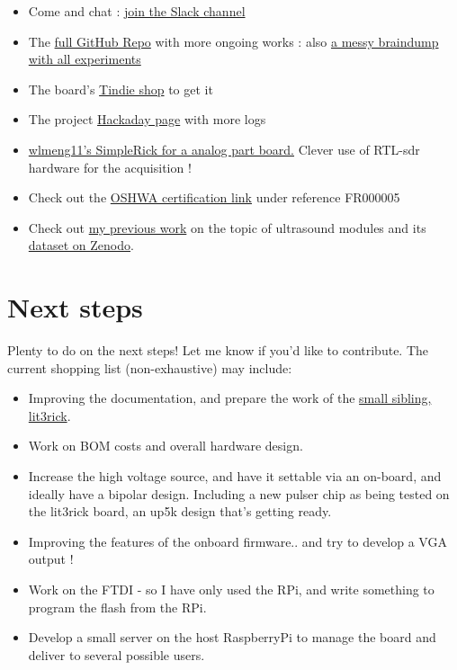 \documentclass{article}
\begin{document}
\begin{itemize}
\item Come and chat : \href{https://join.slack.com/usdevkit/shared_invite/MTkxODU5MjU0NjI1LTE0OTY1ODgxMDEtMmYyZTliZDBlZA}{join the Slack channel} 
\item The \href{https://github.com/kelu124/un0rick}{ full GitHub Repo} with more ongoing works : also \href{https://github.com/kelu124/echomods/}{a messy braindump with all experiments} 
\item The board’s \href{https://www.tindie.com/stores/kelu124/}{Tindie shop} to get it
\item The project \href{https://hackaday.io/project/28375-un0rick-an-ice40-ultrasound-board}{ Hackaday page} with more logs
\item \href{https://github.com/wlmeng11/SimpleRick}{wlmeng11’s SimpleRick for a analog part board.} Clever use of RTL-sdr hardware for the acquisition !
\item Check out the \href{https://certification.oshwa.org/fr000005.html}{OSHWA  certification link} under reference FR000005
\item Check out \href{https://openhardware.metajnl.com/articles/10.5334/joh.2/}{my previous work} on the topic of ultrasound modules \cite{kelu124} and its \href{http://doi.org/10.5281/zenodo.377054}{dataset on Zenodo}.

\end{itemize}

 \section{Next steps}

Plenty to do on the next steps! Let me know if you'd like to contribute. The current shopping list (non-exhaustive) may include:

\begin{itemize}
\item Improving the documentation, and prepare the work of the \href{https://github.com/kelu124/lit3rick}{small sibling, lit3rick}.
\item Work on BOM costs and overall hardware design.
\item Increase the high voltage source, and have it settable via an on-board, and ideally have a bipolar design. Including a new pulser chip as being tested on the lit3rick board, an up5k design that's getting ready.
\item Improving the features of the onboard firmware.. and try to develop a VGA output !
\item Work on the FTDI - so I have only used the RPi, and write something to program the flash from the RPi.
\item Develop a small server on the host RaspberryPi to manage the board and deliver to several possible users.
\end{itemize}
\end{document}
